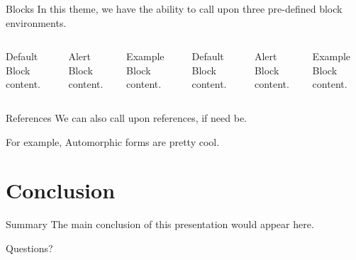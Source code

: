 \documentclass[10pt]{beamer}
\begin{document}
\begin{frame}{Blocks}
  In this theme, we have the ability to call upon three pre-defined block environments.
  \begin{columns}[T,onlytextwidth]
      \begin{block}{Default}
        Block content.
      \end{block}

      \begin{alertblock}{Alert}
        Block content.
      \end{alertblock}

      \begin{exampleblock}{Example}
        Block content.
      \end{exampleblock}



      \begin{block}{Default}
        Block content.
      \end{block}

      \begin{alertblock}{Alert}
        Block content.
      \end{alertblock}

      \begin{exampleblock}{Example}
        Block content.
      \end{exampleblock}

  \end{columns}
\end{frame}

\begin{frame}{References}
  We can also call upon references, if need be. 
  
  For example, Automorphic forms are pretty cool. \cite{Bump96}
\end{frame}

\section{Conclusion}

\begin{frame}{Summary}
  The main conclusion of this presentation would appear here.
\end{frame}

\begin{frame}[standout]
  Questions?
\end{frame}
\end{document}
